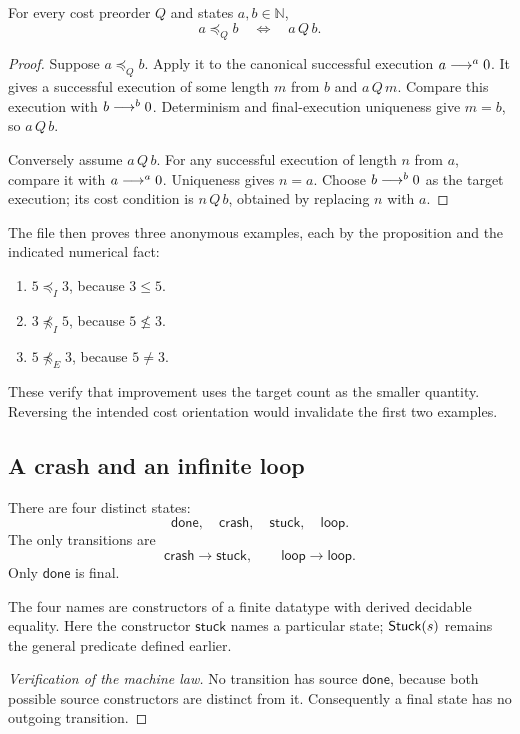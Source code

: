 \begin{proposition}
For every cost preorder $Q$ and states $a,b\in\mathbb N$,
\[
 a\preceq_Q b\quad\Longleftrightarrow\quad a\,Q\,b.
\]
\end{proposition}
\begin{proof}
Suppose $a\preceq_Q b$. Apply it to the canonical successful execution
$a\mathrel{\longrightarrow^{a}}0$. It gives a successful execution of some length $m$
from $b$ and $a\,Q\,m$. Compare this execution with
$b\mathrel{\longrightarrow^{b}}0$. Determinism and final-execution uniqueness give
$m=b$, so $a\,Q\,b$.

Conversely assume $a\,Q\,b$. For any successful execution of length
$n$ from $a$, compare it with $a\mathrel{\longrightarrow^{a}}0$. Uniqueness gives
$n=a$. Choose $b\mathrel{\longrightarrow^{b}}0$ as the target execution; its cost
condition is $n\,Q\,b$, obtained by replacing $n$ with $a$.
\end{proof}

The file then proves three anonymous examples, each by the proposition
and the indicated numerical fact:
\begin{enumerate}
\item $5\preceq_I3$, because $3\leq5$.
\item $3\not\preceq_I5$, because $5\nleq3$.
\item $5\not\preceq_E3$, because $5\ne3$.
\end{enumerate}
These verify that improvement uses the target count as the smaller
quantity. Reversing the intended cost orientation would invalidate the
first two examples.

\subsection{A crash and an infinite loop}

\begin{definition}
There are four distinct states:
\[
 \mathsf{done},\quad\mathsf{crash},\quad\mathsf{stuck},\quad\mathsf{loop}.
\]
The only transitions are
\[
 \mathsf{crash}\to\mathsf{stuck},\qquad
 \mathsf{loop}\to\mathsf{loop}.
\]
Only $\mathsf{done}$ is final.
\end{definition}
The four names are constructors of a finite datatype with derived
decidable equality. Here the constructor $\mathsf{stuck}$ names a
particular state; $\mathsf{Stuck}(s)$ remains the general predicate defined
earlier.
\begin{proof}[Verification of the machine law]
No transition has source $\mathsf{done}$, because both possible source
constructors are distinct from it. Consequently a final state has no
outgoing transition.
\end{proof}

